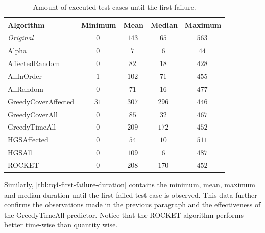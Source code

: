\begin{table}[h]
	\centering
	\begin{tabularx}{\textwidth}{|X||c|c|c|c|}
		\hline
		\textbf{Algorithm} & \textbf{Minimum} & \textbf{Mean} & \textbf{Median} & \textbf{Maximum}\\
		
		\hline
		
		\emph{Original} & $\SI{0}{}$ & $\SI{143}{}$ & $\SI{65}{}$ & $\SI{563}{}$\\
		
		\hline
		
		Alpha & $\SI{0}{}$ & $\SI{7}{}$ & $\SI{6}{}$ & $\SI{44}{}$\\
		
		\hline
		AffectedRandom & $\SI{0}{}$ & $\SI{82}{}$ & $\SI{18}{}$ & $\SI{428}{}$\\
		AllInOrder & $\SI{1}{}$ & $\SI{102}{}$ & $\SI{71}{}$ & $\SI{455}{}$\\
		AllRandom & $\SI{0}{}$ & $\SI{71}{}$ & $\SI{16}{}$ & $\SI{477}{}$\\
		
		\hline
		
		GreedyCoverAffected & $\SI{31}{}$ & $\SI{307}{}$ & $\SI{296}{}$ & $\SI{446}{}$\\
		GreedyCoverAll & $\SI{0}{}$ & $\SI{85}{}$ & $\SI{32}{}$ & $\SI{467}{}$\\
		GreedyTimeAll & $\SI{0}{}$ & $\SI{209}{}$ & $\SI{172}{}$ & $\SI{452}{}$\\
		
		\hline
		
		HGSAffected & $\SI{0}{}$ & $\SI{54}{}$ & $\SI{10}{}$ & $\SI{511}{}$\\
		HGSAll & $\SI{0}{}$ & $\SI{109}{}$ & $\SI{6}{}$ & $\SI{487}{}$\\
		
		\hline
		
		ROCKET & $\SI{0}{}$ & $\SI{208}{}$ & $\SI{170}{}$ & $\SI{452}{}$\\
		
		\hline
	\end{tabularx}
	\caption{Amount of executed test cases until the first failure.}
	\label{tbl:rq4-first-failure}
\end{table}

\noindent Similarly, \autoref{tbl:rq4-first-failure-duration} contains the minimum, mean, maximum and median duration until the first failed test case is observed. This data further confirms the observations made in the previous paragraph and the effectiveness of the GreedyTimeAll predictor. Notice that the ROCKET algorithm performs better time-wise than quantity wise.

